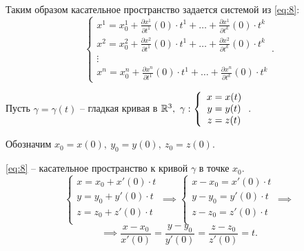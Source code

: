 \begin{definition}
    Таким образом касательное пространство задается системой из \ref{eq:8}:
    \[
        \left\{\begin{array}{l}
            x^1 = x^1_0 + \frac{\partial x^1}{\partial t^1} (0)\cdot t^1 + \ldots + \frac{\partial x^1}{\partial t^k}(0)\cdot t^k \\
            x^2 = x^2_0 + \frac{\partial x^2}{\partial t^1} (0)\cdot t^1 + \ldots + \frac{\partial x^2}{\partial t^k}(0)\cdot t^k \\
            \vdots                                                                                                        \\
            x^n = x^n_0 + \frac{\partial x^n}{\partial t^1} (0)\cdot t^1 + \ldots + \frac{\partial x^n}{\partial t^k}(0)\cdot t^k
        \end{array}\right..
    \]
\end{definition}

\begin{example}
    Пусть $\gamma = \gamma (t)$ -- гладкая кривая в $\R^3, \ \gamma:\left\{\begin{array}{c}
            x = x(t) \\
            y = y(t) \\
            z = z(t)
        \end{array}\right.$.

    Обозначим $x_0 = x(0), \ y_0 = y(0), \ z_0 = z(0)$.

    \ref{eq:8} -- касательное пространство к кривой $\gamma$ в точке $x_0$.
    \[
        \left\{\begin{array}{l}
            x = x_0 + x'(0) \cdot t \\
            y = y_0 + y'(0) \cdot t \\
            z = z_0 + z'(0) \cdot t \\
        \end{array}\right. \implies \left\{\begin{array}{l}
            x - x_0 = x'(0)\cdot t \\
            y - y_0 = y'(0)\cdot t \\
            z - z_0 = z'(0)\cdot t \\
        \end{array}\right. \implies
    \]
    \[
        \implies \frac{x - x_0}{x'(0)} = \frac{y - y_0}{y'(0)} = \frac{z - z_0}{z'(0)} = t.
    \]
\end{example}

